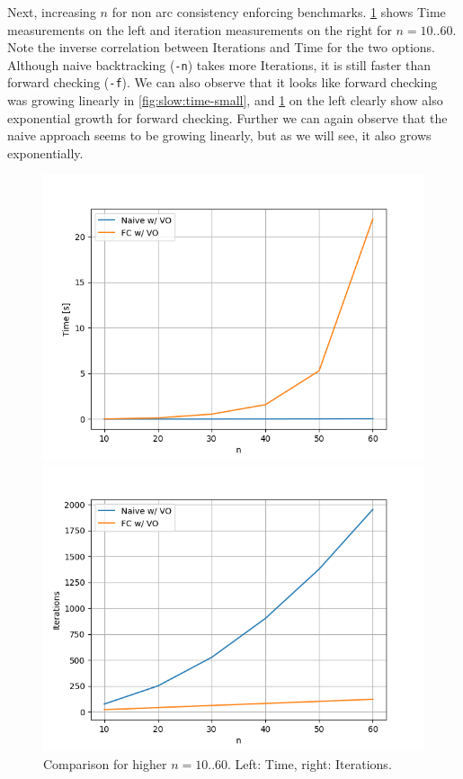 Next, increasing $n$ for non arc consistency enforcing benchmarks. \cref{fig:slow:sidebyside} shows Time measurements on the left and iteration measurements on the right for $n=10..60$. Note the inverse correlation between Iterations and Time for the two options. Although naive backtracking (\verb|-n|) takes more Iterations, it is still faster than forward checking (\verb|-f|). We can also observe that it looks like forward checking was growing linearly in \cref{fig:slow:time-small}, and \cref{fig:slow:sidebyside} on the left clearly show also exponential growth for forward checking. Further we can again observe that the naive approach seems to be growing linearly, but as we will see, it also grows exponentially.

\begin{figure}[ht]
	\centering
	\begin{minipage}{0.49\textwidth}
		\centering
		\includegraphics[width=\textwidth]{./Problems/slow_convergence/plots/time.png}
	\end{minipage}
	\hfill
	\begin{minipage}{0.49\textwidth}
		\centering
		\includegraphics[width=\textwidth]{./Problems/slow_convergence/plots/iterations.png}
	\end{minipage}
	\caption{Comparison for higher $n = 10..60$. Left: Time, right: Iterations.}
	\label{fig:slow:sidebyside}
\end{figure}

